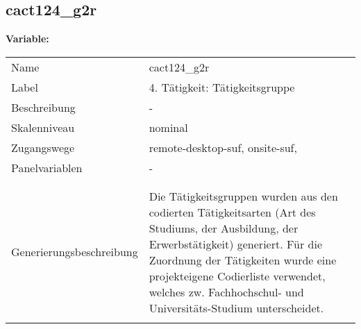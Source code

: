 	
	
	\subsection{cact124\_g2r}
	\label{subSection:cact124_g2r}

	\noindent\textbf{Variable:}\\
		\begin{tabular}{lL{11.3cm}}
			\label{tableVariable:cact124_g2r}
			Name & cact124\_g2r \\
			Label & 4. Tätigkeit: Tätigkeitsgruppe  \\
			Beschreibung & - \\
			Skalenniveau & nominal \\
			Zugangswege &
				remote-desktop-suf,
				onsite-suf,
 \\
			Panelvariablen & -
			 \\
			 \\
 \\
					Generierungsbeschreibung & Die Tätigkeitsgruppen wurden aus den codierten Tätigkeitsarten (Art des Studiums, der Ausbildung, der Erwerbstätigkeit) generiert. Für die Zuordnung der Tätigkeiten wurde eine projekteigene Codierliste verwendet, welches zw. Fachhochschul- und Universitäts-Studium unterscheidet.
				 \\	
			 \\
		\end{tabular}






